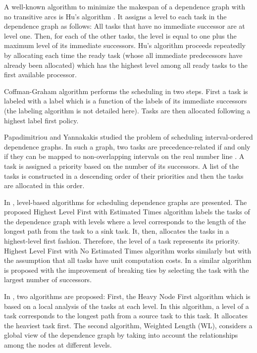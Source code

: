 A well-known algorithm to minimize the makespan of a dependence graph with no transitive arcs is Hu's algorithm \cite{hu:1961}. It assigns a level to each task in the dependence graph as follows: All tasks that have no immediate successor are at level one. Then, for each of the other tasks, the level is equal to one plus the maximum level of its immediate successors. Hu's algorithm proceeds repeatedly by allocating each time the ready task (whose all immediate predecessors have already been allocated) which has the highest level among all ready tasks to the first available processor. 

Coffman-Graham algorithm \cite{coffman:1972} performs the scheduling in two steps. First a task is labeled with a label which is a function of the labels of its immediate successors (the labeling algorithm is not detailed here). Tasks are then allocated following a highest label first policy. 

Papadimitriou and Yannakakis \cite{papadimitriou:1979} studied the problem of scheduling interval-ordered dependence graphs. In such a graph, two tasks are precedence-related if and only if they can be mapped to non-overlapping intervals on the real number line \cite{fishburn:1985}. A task is assigned a priority based on the number of its successors. A list of the tasks is constructed in a descending order of their priorities and then the tasks are allocated in this order. 

In \cite{adam:1974}, level-based algorithms for scheduling dependence graphs are presented. The proposed Highest Level First with Estimated Times algorithm labels the tasks of the dependence graph with levels where a level corresponds to the length of  the longest path from the task to a sink task. It, then, allocates the tasks in a highest-level first fashion. Therefore, the level of a task represents its priority. Highest Level First with No Estimated Times algorithm works similarly but with the assumption that all tasks have unit computation costs. In \cite{kasahara:1984} a similar algorithm is proposed with the improvement of breaking ties by selecting the task with the largest number of successors. 

In \cite{shirazi:1990}, two algorithms are proposed: First, the Heavy Node First algorithm which is based on a local analysis of the tasks at each level. In this algorithm, a level of a task corresponds to the longest path from a source task to this task. It allocates the heaviest task first. The second algorithm, Weighted Length (WL), considers a global view of the dependence graph by taking into account the relationships among the nodes at different levels. 

